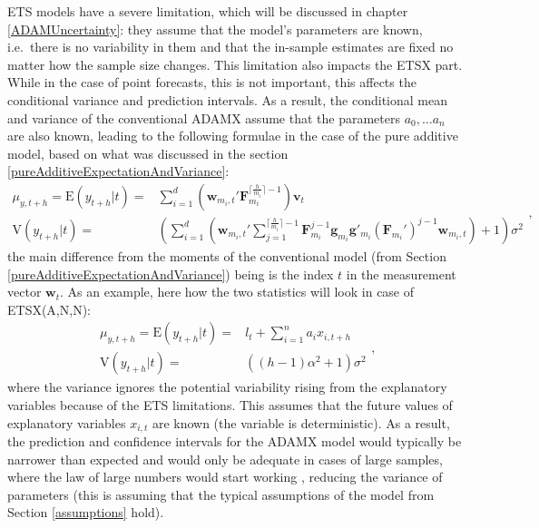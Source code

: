 \documentclass[
]{book}
\theoremstyle{definition}
\theoremstyle{definition}
\theoremstyle{definition}
\theoremstyle{definition}
\theoremstyle{remark}
\begin{document}
ETS models have a severe limitation, which will be discussed in chapter \ref{ADAMUncertainty}: they assume that the model's parameters are known, i.e.~there is no variability in them and that the in-sample estimates are fixed no matter how the sample size changes. This limitation also impacts the ETSX part. While in the case of point forecasts, this is not important, this affects the conditional variance and prediction intervals. As a result, the conditional mean and variance of the conventional ADAMX assume that the parameters \(a_0, \dots a_n\) are also known, leading to the following formulae in the case of the pure additive model, based on what was discussed in the section \ref{pureAdditiveExpectationAndVariance}:
\begin{equation}
  \begin{aligned}
    \mu_{y,t+h} = \text{E}(y_{t+h}|t) = & \sum_{i=1}^d \left(\mathbf{w}_{m_i,t}' \mathbf{F}_{m_i}^{\lceil\frac{h}{m_i}\rceil-1} \right) \mathbf{v}_{t} \\
    \text{V}(y_{t+h}|t) = & \left( \sum_{i=1}^d \left(\mathbf{w}_{m_i,t}' \sum_{j=1}^{\lceil\frac{h}{m_i}\rceil-1} \mathbf{F}_{m_i}^{j-1} \mathbf{g}_{m_i} \mathbf{g}'_{m_i} (\mathbf{F}_{m_i}')^{j-1} \mathbf{w}_{m_i,t} \right) + 1 \right) \sigma^2
  \end{aligned},
  \label{eq:ETSXADAMStateSpaceANNRecursionMeanAndVarianceGeneral}
\end{equation}
the main difference from the moments of the conventional model (from Section \ref{pureAdditiveExpectationAndVariance}) being is the index \(t\) in the measurement vector \(\mathbf{w}_t\). As an example, here how the two statistics will look in case of ETSX(A,N,N):
\begin{equation}
  \begin{aligned}
    \mu_{y,t+h} = \text{E}(y_{t+h}|t) = & l_{t} + \sum_{i=1}^n a_i x_{i,t+h} \\
    \text{V}(y_{t+h}|t) = & \left((h-1) \alpha^2 + 1 \right) \sigma^2
  \end{aligned},
  \label{eq:ETSXADAMStateSpaceANNRecursionMeanAndVariance}
\end{equation}
where the variance ignores the potential variability rising from the explanatory variables because of the ETS limitations. This assumes that the future values of explanatory variables \(x_{i,t}\) are known (the variable is deterministic). As a result, the prediction and confidence intervals for the ADAMX model would typically be narrower than expected and would only be adequate in cases of large samples, where the law of large numbers would start working \citep[Section 4.2 of][]{SvetunkovSBA}, reducing the variance of parameters (this is assuming that the typical assumptions of the model from Section \ref{assumptions} hold).
\end{document}
